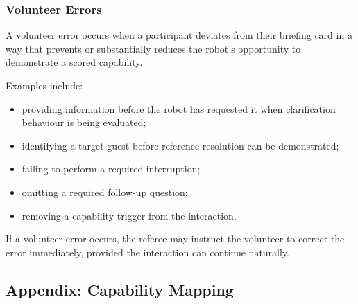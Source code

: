 \subsubsection*{Volunteer Errors}
A volunteer error occurs when a participant deviates from their briefing card in a way that prevents or substantially reduces the robot's opportunity to demonstrate a scored capability.

Examples include:
\begin{itemize}[nosep]
	\item providing information before the robot has requested it when clarification behaviour is being evaluated;
	\item identifying a target guest before reference resolution can be demonstrated;
	\item failing to perform a required interruption;
	\item omitting a required follow-up question;
	\item removing a capability trigger from the interaction.
\end{itemize}

If a volunteer error occurs, the referee may instruct the volunteer to correct the error immediately, provided the interaction can continue naturally.

\subsection*{Appendix: Capability Mapping}

